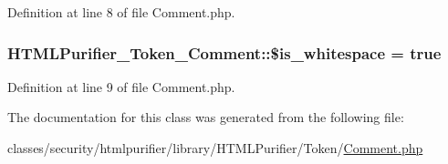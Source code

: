 Definition at line 8 of file Comment.\+php.

\hypertarget{classHTMLPurifier__Token__Comment_a50eee338dd6a4749b5c9224e12a8dede}{
\subsubsection[{\$is\+\_\+whitespace}]{\setlength{\rightskip}{0pt plus 5cm}H\+T\+M\+L\+Purifier\+\_\+\+Token\+\_\+\+Comment\+::\$is\+\_\+whitespace = true}}\label{classHTMLPurifier__Token__Comment_a50eee338dd6a4749b5c9224e12a8dede}


Definition at line 9 of file Comment.\+php.



The documentation for this class was generated from the following file\+:\begin{DoxyCompactItemize}
\item 
classes/security/htmlpurifier/library/\+H\+T\+M\+L\+Purifier/\+Token/\hyperlink{Comment_8php}{Comment.\+php}\end{DoxyCompactItemize}
